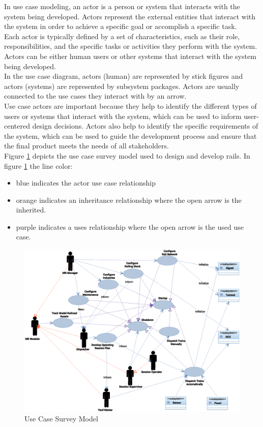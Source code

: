 In use case modeling, an actor is a person or system that interacts with the system being developed. Actors represent the external entities that interact with the system in order to achieve a specific goal or accomplish a specific task.\vspace{5mm} \\
Each actor is typically defined by a set of characteristics, such as their role, responsibilities, and the specific tasks or activities they perform with the system. Actors can be either human users or other systems that interact with the system being developed.\vspace{5mm} \\
In the use case diagram, actors (human) are represented by stick figures and actors (systems) are represented by subsystem packages. Actors are usually connected to the use cases they interact with by an arrow.\vspace{5mm} \\
Use case actors are important because they help to identify the different types of users or systems that interact with the system, which can be used to inform user-centered design decisions. Actors also help to identify the specific requirements of the system, which can be used to guide the development process and ensure that the final product meets the needs of all stakeholders.\vspace{5mm} \\
Figure \ref{fig:use-case} depicts the use case survey model used to design and develop \gls{rails}.
In figure \ref{fig:use-case} the line color:
\begin{itemize}
  \item blue indicates the actor use case relationship
  \item orange indicates an inheritance relationship where the open arrow is the inherited.
  \item purple indicates a uses relationship where the open arrow is the used use case.
\end{itemize}
\begin{figure}
	\centering
		\includegraphics[scale=0.55]{use-case.eps}
	\caption{Use Case Survey Model}
	\label{fig:use-case}
\end{figure}
